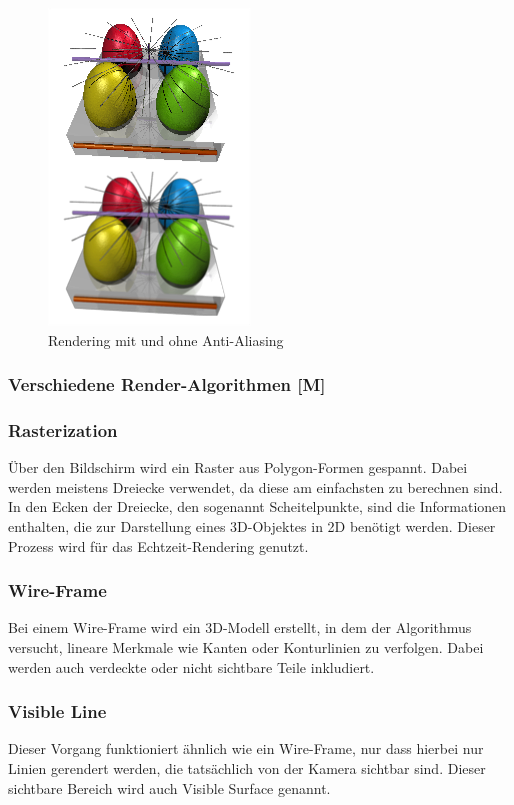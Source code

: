 \begin{figure}
    \centering
    \includegraphics[scale=0.7]{pics/anti-aliasing.png}
    \caption{Rendering mit und ohne Anti-Aliasing \cite{AntiAliasing}}
    \label{fig:impl:anti-aliasing}
\end{figure}

\subsubsection{Verschiedene Render-Algorithmen [M]}
\subsubsection{Rasterization}
Über den Bildschirm wird ein Raster aus Polygon-Formen gespannt. Dabei werden meistens Dreiecke verwendet, da diese am einfachsten zu berechnen sind. In den Ecken der Dreiecke, den sogenannt Scheitelpunkte, sind die Informationen enthalten, die zur Darstellung eines 3D-Objektes in 2D benötigt werden. Dieser Prozess wird für das Echtzeit-Rendering genutzt. \cite{RayTracingRasterization}

\subsubsection{Wire-Frame}
Bei einem Wire-Frame wird ein 3D-Modell erstellt, in dem der Algorithmus versucht, lineare Merkmale wie Kanten oder Konturlinien zu verfolgen. Dabei werden auch verdeckte oder nicht sichtbare Teile inkludiert. 
\cite{Rendering3DModels} 

\subsubsection{Visible Line}
Dieser Vorgang funktioniert ähnlich wie ein Wire-Frame, nur dass hierbei nur Linien gerendert werden, die tatsächlich von der Kamera sichtbar sind. Dieser sichtbare Bereich wird auch Visible Surface genannt. 
\cite{Rendering3DModels} 

